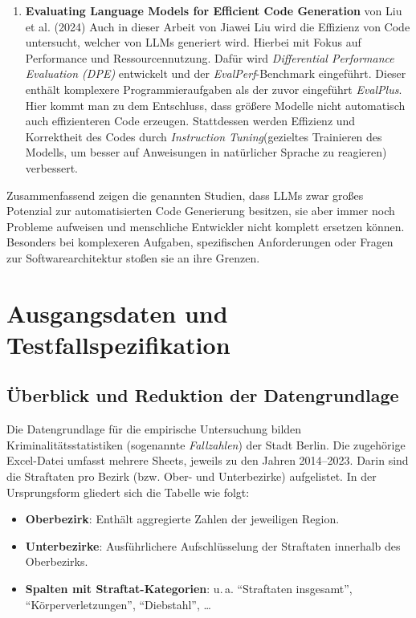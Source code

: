 \documentclass[11pt,a4paper]{article}
\begin{document}
\begin{enumerate}
    \item \textbf{Evaluating Language Models for Efficient Code Generation} von Liu et al. (2024) \cite{liu2024evaluating}
    Auch in dieser Arbeit von Jiawei Liu wird die Effizienz von Code untersucht, welcher von LLMs generiert wird. Hierbei mit Fokus auf Performance und Ressourcennutzung. Dafür wird \emph{Differential Performance Evaluation (DPE)} entwickelt und der \emph{EvalPerf}-Benchmark eingeführt. Dieser enthält komplexere Programmieraufgaben als der zuvor eingeführt \emph{EvalPlus}. Hier kommt man zu dem Entschluss, dass größere Modelle nicht automatisch auch effizienteren Code erzeugen. Stattdessen werden Effizienz und Korrektheit des Codes durch \emph{Instruction Tuning}(gezieltes Trainieren des Modells, um besser auf Anweisungen in natürlicher Sprache zu reagieren) verbessert.
\end{enumerate}
Zusammenfassend zeigen die genannten Studien, dass LLMs zwar großes Potenzial zur automatisierten Code Generierung besitzen, sie aber immer noch Probleme aufweisen und menschliche Entwickler nicht komplett ersetzen können. Besonders bei komplexeren Aufgaben, spezifischen Anforderungen oder Fragen zur Softwarearchitektur stoßen sie an ihre Grenzen.

\section{Ausgangsdaten und Testfallspezifikation}
\subsection{Überblick und Reduktion der Datengrundlage}
Die Datengrundlage für die empirische Untersuchung bilden Kriminalitätsstatistiken (sogenannte \emph{Fallzahlen}) der Stadt Berlin\cite{opendataberlin}. Die zugehörige Excel-Datei umfasst mehrere Sheets, jeweils zu den Jahren 2014--2023. Darin sind die Straftaten pro Bezirk (bzw. Ober- und Unterbezirke) aufgelistet. In der Ursprungsform gliedert sich die Tabelle wie folgt:
\begin{itemize}
    \item \textbf{Oberbezirk}: Enthält aggregierte Zahlen der jeweiligen Region.
    \item \textbf{Unterbezirke}: Ausführlichere Aufschlüsselung der Straftaten innerhalb des Oberbezirks.
    \item \textbf{Spalten mit Straftat-Kategorien}: u.\,a. \enquote{Straftaten insgesamt}, \enquote{Körperverletzungen}, \enquote{Diebstahl}, \dots
\end{itemize}
\end{document}
